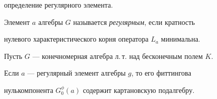 определение регулярного элемента. 


 


 


\begin{defn} 


Элемент $a$ алгебры $G$ называется {\it регулярным}, если кратность  


нулевого характеристического корня оператора $L_a$ минимальна. 


\end{defn} 


 


 


\begin{thm} 


Пусть $G$ --- конечномерная алгебра л.\,т. над бесконечным полем $K$. 


Если $a$ --- регулярный элемент алгебры $g$, то его фиттингова 


нулькомпонента $G^\phi_0(a)$ содержит картановскую подалгебру.  


\end{thm} 


 


 


